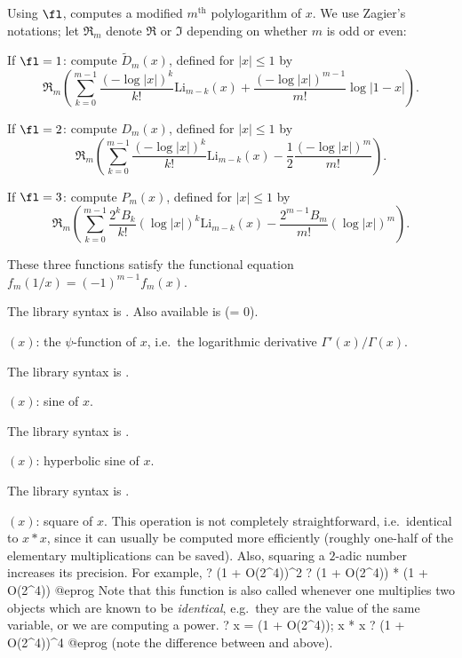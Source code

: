 Using $\fl$, computes a modified $m^\text{th}$ polylogarithm of $x$.
We use Zagier's notations; let $\Re_m$ denote $\Re$ or $\Im$ depending
on whether $m$ is odd or even:

If $\fl=1$: compute $\tilde D_m(x)$, defined for $|x|\le1$ by
$$\Re_m\left(\sum_{k=0}^{m-1} \dfrac{(-\log|x|)^k}{k!}\text{Li}_{m-k}(x)
+\dfrac{(-\log|x|)^{m-1}}{m!}\log|1-x|\right).$$

If $\fl=2$: compute $D_m(x)$, defined for $|x|\le1$ by
$$\Re_m\left(\sum_{k=0}^{m-1}\dfrac{(-\log|x|)^k}{k!}\text{Li}_{m-k}(x)
-\dfrac{1}{2}\dfrac{(-\log|x|)^m}{m!}\right).$$

If $\fl=3$: compute $P_m(x)$, defined for $|x|\le1$ by
$$\Re_m\left(\sum_{k=0}^{m-1}\dfrac{2^kB_k}{k!}(\log|x|)^k\text{Li}_{m-k}(x)
-\dfrac{2^{m-1}B_m}{m!}(\log|x|)^m\right).$$

These three functions satisfy the functional equation
$f_m(1/x) = (-1)^{m-1}f_m(x)$.

The library syntax is .
Also available is
 (\fl = 0).

$(x)$: \label{se:psi}the $\psi$-function of $x$, i.e.~the
logarithmic derivative $\Gamma'(x)/\Gamma(x)$.

The library syntax is .

$(x)$: \label{se:sin}sine of $x$.

The library syntax is .

$(x)$: \label{se:sinh}hyperbolic sine of $x$.

The library syntax is .

$(x)$: \label{se:sqr}square of $x$. This operation is not completely
straightforward, i.e.~identical to $x * x$, since it can usually be
computed more efficiently (roughly one-half of the elementary
multiplications can be saved). Also, squaring a $2$-adic number increases
its precision. For example,
\bprog
? (1 + O(2^4))^2
? (1 + O(2^4)) * (1 + O(2^4))
@eprog\noindent
Note that this function is also called whenever one multiplies two objects
which are known to be \emph{identical}, e.g.~they are the value of the same
variable, or we are computing a power.
\bprog
? x = (1 + O(2^4)); x * x
? (1 + O(2^4))^4
@eprog\noindent
(note the difference between  and  above).

